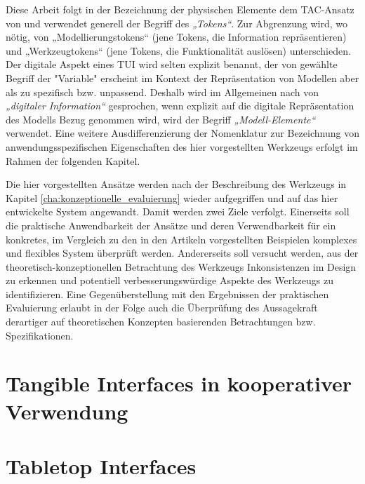 Diese Arbeit folgt in der Bezeichnung der physischen Elemente dem TAC-Ansatz von \citep{Shaer04} und verwendet generell der Begriff des \emph{„Tokens“}. Zur Abgrenzung wird, wo nötig, von „Modellierungstokens“ (jene Tokens, die Information repräsentieren) und „Werkzeugtokens“ (jene Tokens, die Funktionalität auslösen) unterschieden. Der digitale Aspekt eines \gls{TUI} wird selten explizit benannt, der von \citep{Shaer04} gewählte Begriff der "Variable" erscheint im Kontext der Repräsentation von Modellen aber als zu spezifisch bzw. unpassend. Deshalb wird im Allgemeinen nach \citep{Ishii08} von \emph{„digitaler Information“} gesprochen, wenn explizit auf die digitale Repräsentation des Modells Bezug genommen wird, wird der Begriff \emph{„Modell-Elemente“} verwendet. Eine weitere Ausdifferenzierung der Nomenklatur zur Bezeichnung von anwendungsspezifischen Eigenschaften des hier vorgestellten Werkzeugs erfolgt im Rahmen der folgenden Kapitel.

Die hier vorgestellten Ansätze werden nach der Beschreibung des Werkzeugs in Kapitel \ref{cha:konzeptionelle_evaluierung} wieder aufgegriffen und auf das hier entwickelte System angewandt. Damit werden zwei Ziele verfolgt. Einerseits soll die praktische Anwendbarkeit der Ansätze und deren Verwendbarkeit für ein konkretes, im Vergleich zu den in den Artikeln vorgestellten Beispielen komplexes und flexibles System überprüft werden. Andererseits soll versucht werden, aus der theoretisch-konzeptionellen Betrachtung des Werkzeugs Inkonsistenzen im Design zu erkennen und potentiell verbesserungswürdige Aspekte des Werkzeugs zu identifizieren. Eine Gegenüberstellung mit den Ergebnissen der praktischen Evaluierung erlaubt in der Folge auch die Überprüfung des Aussagekraft derartiger auf theoretischen Konzepten basierenden Betrachtungen bzw. Spezifikationen.



\section{Tangible Interfaces in kooperativer Verwendung} %
\label{sub:tangible_interfaces_in_kooperativer_verwendung}
\citep{Hornecker04}


\section{Tabletop Interfaces} %
\label{sec:tabletop_interfaces}

